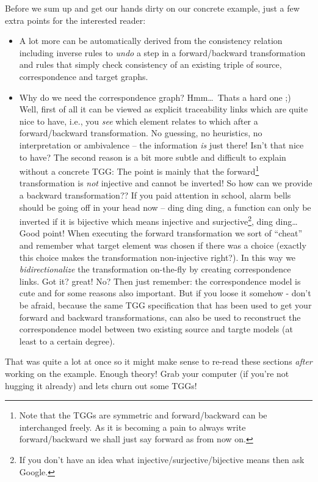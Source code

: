 Before we sum up and get our hands dirty on our concrete example, just a few extra points for the interested reader:  
\begin{itemize}
\item A lot more can be automatically derived from the consistency relation including inverse rules to \emph{undo} a step in a forward/backward transformation and rules that simply check consistency of an existing triple of source, correspondence and target graphs.

\item Why do we need the correspondence graph?  Hmm\dots\, Thats a hard one ;)  Well, first of all it can be viewed as explicit traceability links which are quite nice to have, i.e., you \emph{see} which element relates to which after a forward/backward transformation. No guessing, no heuristics, no interpretation or ambivalence -- the information \emph{is} just there!
Isn't that nice to have?
The second reason is a bit more subtle and difficult to explain without a concrete TGG:  The point is mainly that the forward\footnote{Note that the TGGs are symmetric and forward/backward can be interchanged freely.  As it is becoming a pain to always write forward/backward we shall just say forward as from now on.} transformation is \emph{not} injective and cannot be inverted!
So how can we provide a backward transformation??
If you paid attention in school, alarm bells should be going off in your head now -- ding ding ding, a function can only be inverted if it is bijective which means injective and surjective\footnote{If you don't have an idea what injective/surjective/bijective means then ask Google.}, ding ding\ldots~
Good point!  When executing the forward transformation we sort of ``cheat'' and remember what target element was chosen if there was a choice (exactly this choice makes the transformation non-injective right?).
In this way we \emph{bidirectionalize} the transformation on-the-fly by creating correspondence links.
Got it? great! No?  Then just remember: the correspondence model is cute and for some reasons also important.
But if you loose it somehow - don't be afraid, because the same TGG specification that has been used to get your forward and backward transformations, can also be used to reconstruct the correspondence model between two existing source and targte models (at least to a certain degree).
\end{itemize}

That was quite a lot at once so it might make sense to re-read these sections \emph{after} working on the example.
Enough theory!  Grab your computer (if you're not hugging it already) and lets churn out some TGGs!
